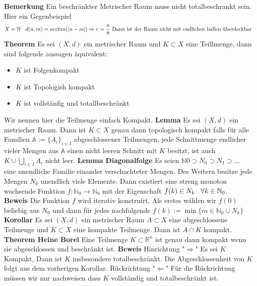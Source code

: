 \documentclass{article}
\newcommand{\smspc}{\hspace{0.3cm}}
\begin{document}
\textbf{Bemerkung} Ein beschränkter Metrischer Raum muss nicht totalbeschrankt sein. Hier ein Gegenbeispiel\[X=\mathbb{N} \smspc d(n,m)=arctan(|n-m|)\Rightarrow r=\frac{\pi}{8}\text{ Dann ist der Raum nicht mit endlichen bällen überdeckbar}\]
\newpage\textbf{Theorem} Es sei $(X,d)$ ein metrischer Raum und $K\subset X$ eine Teillmenge, dann sind folgende aussagen äquivalent:
\begin{itemize}
  \item{$K$ ist Folgenkompakt}
  \item{$K$ ist Topologish  kompakt}
  \item{$K$ ist vollstänfig und totallbeschränkt}
\end{itemize}
Wir nennen hier die Teilmenge einfach Kompakt.
\newline\textbf{Lemma} Es sei $(X,d)$ ein metrischer Raum. Dann ist $K\subset X$ genau dann topologisch kompakt falls für alle Familien $\mathbb{A}:=\lbrace A_i\rbrace_{i\in I}$ abgeschlossener Teilmengen, jede Schnittmenge endlicher vieler Mengen aus $\mathbb{A}$ einen nicht leeren Schnitt mit $K$ besitzt, ist auch $K\cup\bigcup_{i\in I} A_i$ nicht leer.
\newline\textbf{Lemma Diagonalfolge} Es seien $\mathbb{N}0\supset N_0\supset N_1\supset ...$ eine unendliche Familie einander verschachteter Mengen. Des Weitern besitze jede Mengen $N_k$ unendlich viele Elemente.
Dann existiert eine streng monoton wachsende Funktion $f:\mathbb{N}_0\rightarrow \mathbb{N}_0$ mit der Eigenschaft $f(k)\in N_k \smspc \forall k\in\mathbb{N}_0$.\newline
\textbf{Beweis} Die Funktion $f$ wird iterativ konstruirt, Als erstes wählen wir $f(0)$ beliebig aus $N_0$ und dann für jedes nachfolgende $f(k):=\min\lbrace m\in\mathbb{N}_0\cup N_k\rbrace$\newline
\textbf{Korollar} Es sei $(X,d)$ ein metrischer Raum $A\subset X$ eine abgeschlossene Teilmenge und $K\subset X$ eine kompakte Teilmenge. Dann ist $A\cap K$ kompakt.\newline
\noindent\textbf{Theorem Heine Borel} Eine Teilmenge $K\subset \mathbb{R}^n$ ist genau dann kompakt wenn sie abgeschlossen und beschränkt ist.
\textbf{Beweis}  \newline Hinrichtung "$\Rightarrow$" Es sei $K$ Kompakt, Dann ist $K$ insbesondere totalbeschränkt. Die Abgeschlossenheit von $K$ folgt aus dem vorherigen Korollar.
\newline Rückrichtung "$\Leftarrow$" Für die Rückrichtung müssen wir nur nachweisen dass $K$ vollständig und totalbeschränkt ist.
\end{document}
